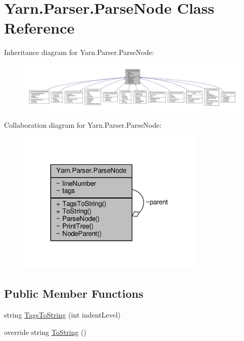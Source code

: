 \hypertarget{a00120}{\section{Yarn.\-Parser.\-Parse\-Node Class Reference}
\label{a00120}
}


Inheritance diagram for Yarn.\-Parser.\-Parse\-Node\-:
\nopagebreak
\begin{figure}[H]
\begin{center}
\leavevmode
\includegraphics[width=350pt]{d4/dc4/a00617}
\end{center}
\end{figure}


Collaboration diagram for Yarn.\-Parser.\-Parse\-Node\-:
\nopagebreak
\begin{figure}[H]
\begin{center}
\leavevmode
\includegraphics[width=254pt]{de/d85/a00618}
\end{center}
\end{figure}
\subsection*{Public Member Functions}
\begin{DoxyCompactItemize}
\item 
string \hyperlink{a00120_a054f36c80d5eeacd569a8859f599af67}{Tags\-To\-String} (int indent\-Level)
\item 
override string \hyperlink{a00120_a18c67cb16090d0889bb9d6c8c6c565f8}{To\-String} ()
\end{DoxyCompactItemize}
